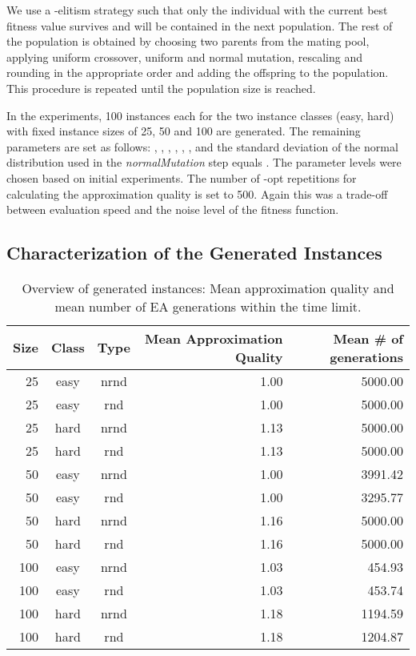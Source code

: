 \documentclass{article}
\begin{document}
We use a -elitism strategy such that only the individual with the
current best fitness value survives and will be contained in the next
population. The rest of the population is obtained by choosing two
parents from the mating pool, applying uniform crossover, uniform and
normal mutation, rescaling and rounding in the appropriate order and
adding the offspring to the population. This procedure is repeated
until the population size is reached.

In the experiments, 100 instances each for the two instance classes
(easy, hard) with fixed instance sizes of 25, 50 and 100 are
generated. The remaining parameters are set as follows:
, , ,
, , , and the standard deviation of the normal
distribution used in the \textit{normalMutation} step equals
. The parameter levels were chosen
based on initial experiments. The number of -opt repetitions for
calculating the approximation quality is set to 500. Again this was a
trade-off between evaluation speed and the noise level of the fitness
function.

\subsection{Characterization of the Generated Instances}
\label{sec:charInst}

\begin{table}
  \begin{tabular}{rccrr}
  \toprule
Size & Class & Type & Mean Approximation Quality & Mean \# of generations \\
  \midrule
 25 & easy & nrnd & 1.00 & 5000.00 \\
   25 & easy & rnd & 1.00 & 5000.00 \\
   25 & hard & nrnd & 1.13 & 5000.00 \\
   25 & hard & rnd & 1.13 & 5000.00 \\\midrule
   50 & easy & nrnd & 1.00 & 3991.42 \\
   50 & easy & rnd & 1.00 & 3295.77 \\
   50 & hard & nrnd & 1.16 & 5000.00 \\
   50 & hard & rnd & 1.16 & 5000.00 \\\midrule
  100 & easy & nrnd & 1.03 & 454.93 \\
  100 & easy & rnd & 1.03 & 453.74 \\
  100 & hard & nrnd & 1.18 & 1194.59 \\
  100 & hard & rnd & 1.18 & 1204.87 \\
   \bottomrule
\end{tabular}
   \caption{Overview of generated instances: Mean approximation
    quality and mean number of EA generations within the time limit.}
  \label{tab:qualgen}
\end{table}
\end{document}
